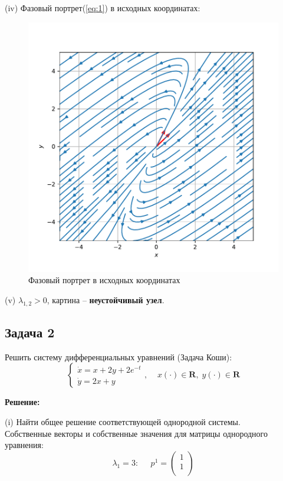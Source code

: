 \documentclass[a4paper, 12pt]{article}
\begin{document}
(iv) Фазовый портрет(\ref{eq:1}) в исходных координатах:

\begin{figure}[H]
	\centering
	\includegraphics[scale=0.55]{1a1_1}
	\caption{Фазовый портрет в исходных координатах}
	\label{im:1a1_1}
\end{figure}

(v) $\lambda_{1,2}>0$, картина -- \textbf{неустойчивый узел}.


	\subsection* {Задача 2}
 Решить систему дифференциальных уравнений (Задача Коши): 
\begin{equation}
\left\{
\begin{array}{lr}
\dot{x} = x+2y+2e^{-t}\\
\dot{y} = 2x+y
\end{array}
\right.
, \;\;\;\; x(\cdot)\in \textbf{R},\; y(\cdot)\in \textbf{R}
\label{eq:16}
\end{equation}

\textbf{Решение:} \par


(i) Найти общее решение соответствующей однородной системы.\\
Собственные векторы и собственные значения для матрицы однородного уравнения:
\[\lambda_1 = 3:\;\;\;\;\; p^1=
\left(
\begin{array}{cc}
1\\
1\\
\end{array}
\right)  
\]
\end{document}
